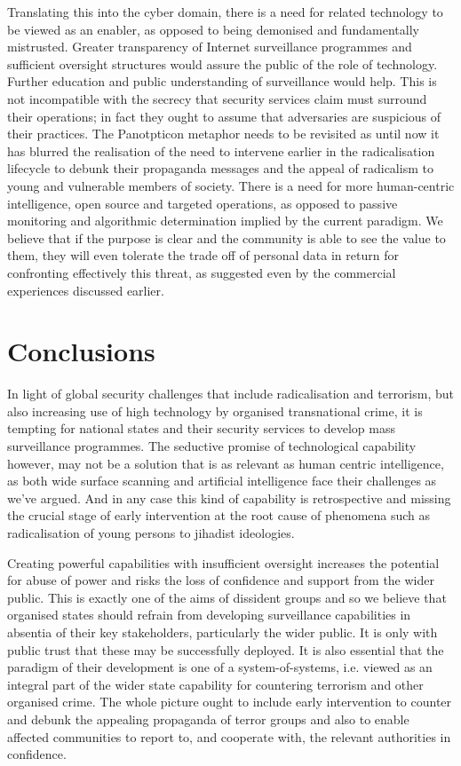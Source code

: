\documentclass{llncs}
\begin{document}
Translating this into the cyber domain, there is a need for related technology to be viewed as an enabler, as opposed to being demonised and fundamentally mistrusted. Greater transparency of Internet surveillance programmes and sufficient oversight structures would assure the public of the role of technology. Further education and public understanding of surveillance would help. This is not incompatible with the secrecy that security services claim must surround their operations; in fact they ought to assume that adversaries are suspicious of their practices. The Panotpticon metaphor needs to be revisited as until now it has blurred the realisation of the need to intervene earlier in the radicalisation lifecycle to debunk their propaganda messages and the appeal of radicalism to young and vulnerable members of society. There is a need for more human-centric intelligence, open source and targeted operations, as opposed to passive monitoring and algorithmic determination implied by the current paradigm. We believe that if the purpose is clear and the community is able to see the value to them, they will even tolerate the trade off of personal data in return for confronting effectively this threat, as suggested even by the commercial experiences discussed earlier.

\section{Conclusions}
\label{sec:Conclusions}
In light of global security challenges that include radicalisation and terrorism, but also increasing use of high technology by organised transnational crime, it is tempting for national states and their security services to develop mass surveillance programmes. The seductive promise of technological capability however, may not be a solution that is as relevant as human centric intelligence, as both wide surface scanning and artificial intelligence face their challenges as we've argued. And in any case this kind of capability is retrospective and missing the crucial stage of early intervention at the root cause of phenomena such as radicalisation of young persons to jihadist ideologies.

Creating powerful capabilities with insufficient oversight increases the potential for abuse of power and risks the loss of confidence and support from the wider public. This is exactly one of the aims of dissident groups and so we believe that organised states should refrain from developing surveillance capabilities in absentia of their key stakeholders, particularly the wider public. It is only with public trust that these may be successfully deployed. It is also essential that the paradigm of their development is one of a system-of-systems, i.e. viewed as an integral part of the wider state capability for countering terrorism and other organised crime. The whole picture ought to include early intervention to counter and debunk the appealing propaganda of terror groups and also to enable affected communities to report to, and cooperate with, the relevant authorities in confidence.
\end{document}
